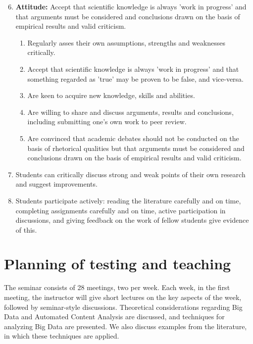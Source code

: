 \documentclass[a4paper,12pt]{report}
\begin{document}
{\footnotesize{
\begin{enumerate}
	\setcounter{enumi}{5}
	\item{\textbf{Attitude:} Accept that scientific knowledge is always 'work in progress' and that arguments must be considered and conclusions drawn on the basis of empirical results and valid criticism.}
	\begin{enumerate}
		\item{Regularly asses their own assumptions, strengths and weaknesses critically.}
		\item{Accept that scientific knowledge is always 'work in progress' and that something regarded as 'true' may be proven to be false, and vice-versa.}
		\item{Are keen to acquire new knowledge, skills and abilities.}
		\item{Are willing to share and discuss arguments, results and conclusions, including submitting one's own work to peer review.}
		\item{Are convinced that academic debates should not be conducted on the basis of rhetorical qualities but that arguments must be considered and conclusions drawn on the basis of empirical results and valid criticism.}
	\end{enumerate}
\end{enumerate}
 }}

\begin{enumerate}[A]
\setcounter{enumi}{6}
\item Students can critically discuss  strong and weak points of their own research and suggest improvements.
\item Students participate actively: reading the literature carefully and on time, completing assignments carefully and on time, active participation in discussions, and giving feedback on the work of fellow students give evidence of this.
\end{enumerate}



\chapter{Planning of testing and teaching}

The seminar consists of 28 meetings, two per week. Each week, in the first meeting, the instructor will give short lectures on the key aspects of the week, followed by seminar-style discussions. Theoretical considerations regarding Big Data and Automated Content Analysis are discussed, and techniques for analyzing Big Data are presented. We also discuss examples from the literature, in which these techniques are applied.
\end{document}
